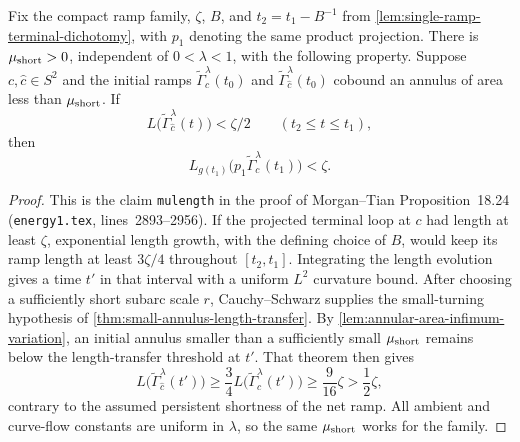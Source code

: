 \begin{lemma}
\label{lem:finite-net-short-terminal-transfer}
\notready
Fix the compact ramp family, $\zeta$, $B$, and
$t_2=t_1-B^{-1}$ from
\ref{lem:single-ramp-terminal-dichotomy}, with $p_1$ denoting the same product
projection.  There is $\mu_{\rm short}>0$,
independent of $0<\lambda<1$, with the following property.  Suppose
$c,\widehat c\in S^2$ and the initial ramps
$\widetilde\Gamma_c^\lambda(t_0)$ and
$\widetilde\Gamma_{\widehat c}^\lambda(t_0)$ cobound an annulus of area less
than $\mu_{\rm short}$.  If
\[
 L\bigl(\widetilde\Gamma_{\widehat c}^\lambda(t)\bigr)<\zeta/2
 \qquad(t_2\le t\le t_1),
\]
then
\[
 L_{g(t_1)}\bigl(p_1\widetilde\Gamma_c^\lambda(t_1)\bigr)<\zeta.
\]
\end{lemma}

\begin{proof}
This is the claim \texttt{mulength} in the proof of Morgan--Tian
Proposition~18.24 (\texttt{energy1.tex}, lines~2893--2956).  If the projected
terminal loop at $c$ had length at least $\zeta$, exponential length growth,
with the defining choice of $B$, would keep its ramp length at least
$3\zeta/4$ throughout $[t_2,t_1]$.  Integrating the length evolution gives a
time $t'$ in that interval with a uniform $L^2$ curvature bound.  After
choosing a sufficiently short subarc scale $r$, Cauchy--Schwarz supplies the
small-turning hypothesis of
\ref{thm:small-annulus-length-transfer}.  By
\ref{lem:annular-area-infimum-variation}, an initial annulus smaller than a
sufficiently small $\mu_{\rm short}$ remains below the length-transfer
threshold at $t'$.  That theorem then gives
\[
 L\bigl(\widetilde\Gamma_{\widehat c}^\lambda(t')\bigr)
 \ge\frac34L\bigl(\widetilde\Gamma_c^\lambda(t')\bigr)
 \ge\frac9{16}\zeta>\frac12\zeta,
\]
contrary to the assumed persistent shortness of the net ramp.  All ambient
and curve-flow constants are uniform in $\lambda$, so the same
$\mu_{\rm short}$ works for the family.
\end{proof}


